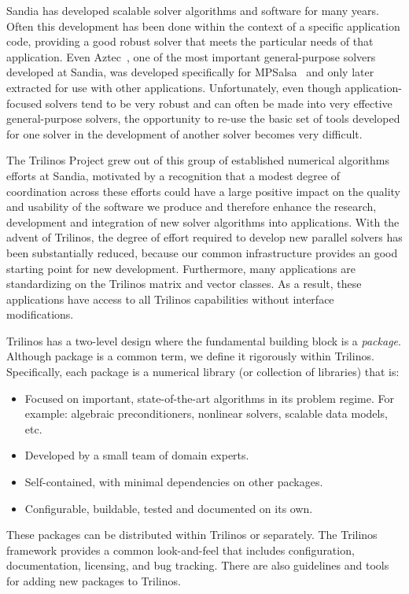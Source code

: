 \documentclass[12pt,relax]{TPA}
\begin{document}
Sandia has developed scalable solver algorithms and software for many years.  
Often this development has been done within the context of 
a specific application code, providing a good robust solver that 
meets the particular needs of that application.  Even Aztec~\cite{Aztec2.1}, one of 
the most important general-purpose solvers developed at Sandia, was 
developed specifically for MPSalsa~\cite{MPSalsa-User-Guide,MPSalsa-Theory} 
and only later extracted for use with other applications.  Unfortunately, 
even though application-focused solvers tend to be very robust and can 
often be made into very effective general-purpose solvers, the 
opportunity to re-use the basic set of tools developed for one solver 
in the development of another solver becomes very difficult.

The Trilinos Project grew out of this group of established numerical algorithms
efforts at Sandia, motivated by  a recognition that a modest degree of 
coordination across these efforts could have a large positive impact on 
the quality and usability of the software we produce and therefore enhance the
research, development and integration of new solver algorithms into
applications.  With the advent of Trilinos, the degree of effort required 
to develop new parallel solvers has been 
substantially reduced, because our common infrastructure provides an good 
starting point for new development.  Furthermore, many applications 
are standardizing on the 
Trilinos matrix and vector classes.  As a result, these applications
have access to all Trilinos capabilities without  
interface modifications. 

Trilinos has a two-level design where the fundamental building block
is a {\it package}.  Although package is a common term, we define it
rigorously within Trilinos.  Specifically, each package is a numerical
library (or collection of libraries) that is:
\begin{itemize}
\item Focused on important, state-of-the-art algorithms in its problem
regime.  For example: algebraic preconditioners, nonlinear solvers, 
scalable data models, etc.
\item Developed by a small team of domain experts.
\item Self-contained, with minimal dependencies on other packages.
\item Configurable, buildable, tested and documented on its own.
\end{itemize}
These packages can be distributed within Trilinos or separately. 
The Trilinos framework provides a common look-and-feel that 
includes configuration, documentation, licensing, and bug 
tracking.  There are also guidelines and tools for adding new packages 
to Trilinos. 
\end{document}
